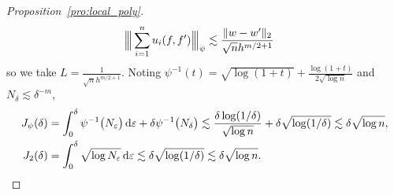 \begin{proof}[Proposition~\ref{pro:local_poly}]
\begin{align*}
    {\Big\vert\kern-0.3ex\Big\vert\kern-0.3ex\Big\vert} \sum_{i=1}^n u_i(f,f') {\Big\vert\kern-0.3ex\Big\vert\kern-0.3ex\Big\vert}_\psi
    &\lesssim
    \frac{\|w-w'\|_2}{\sqrt{n} h^{m/2+1}}
  \end{align*}
  so we take $L = \frac{1}{\sqrt{n} h^{m/2+1}}$.
  Noting
  $\psi^{-1}(t) = \sqrt{\log(1+t)} + \frac{\log(1+t)}{2\sqrt{\log n}}$
  and $N_\delta \lesssim \delta^{-m}$,
  \begin{align*}
    J_\psi(\delta)
    &=
    \int_0^\delta
    \psi^{-1}\big( N_\varepsilon \big)
    \,\mathrm{d}\varepsilon
    + \delta
    \psi^{-1} \big( N_\delta \big)
    \lesssim
    \frac{\delta \log(1/\delta)}{\sqrt{\log n}}
    + \delta \sqrt{\log(1/\delta)}
    \lesssim
    \delta \sqrt{\log n}, \\
    J_2(\delta)
    &=
    \int_0^\delta
    \sqrt{\log N_\varepsilon}
    \,\mathrm{d}\varepsilon
    \lesssim
    \delta \sqrt{\log(1/\delta)}
    \lesssim
    \delta \sqrt{\log n}.
  \end{align*}



\end{proof}
